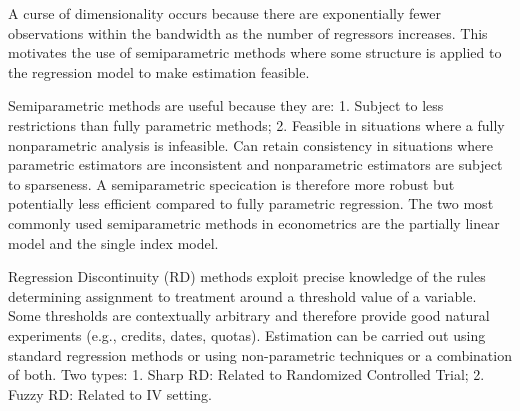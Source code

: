 \documentclass[7pt, a4paper]{article}
\begin{document}
\begin{multicols*}{3}
A curse of dimensionality occurs because there are exponentially fewer observations within the bandwidth as the number of regressors increases. This motivates the use of semiparametric methods where some structure is applied to the regression model to make estimation feasible.

Semiparametric methods are useful because they are: 1. Subject to less restrictions than fully parametric methods; 2. Feasible in situations where a fully nonparametric analysis is infeasible.
Can retain consistency in situations where parametric estimators are inconsistent and nonparametric estimators are subject to sparseness. A semiparametric specication is therefore more robust but potentially less efficient compared to fully parametric regression. The two most commonly used semiparametric methods in econometrics are the partially linear model and the single index model.

Regression Discontinuity (RD) methods exploit precise knowledge of the rules determining assignment to treatment around a threshold value of a variable. Some thresholds are contextually arbitrary and therefore provide good natural experiments (e.g., credits, dates, quotas). Estimation can be carried out using standard regression methods or using non-parametric techniques or a combination of both. Two types: 1. Sharp RD: Related to Randomized Controlled Trial; 2. Fuzzy RD: Related to IV setting.
\end{multicols*}
\end{document}
